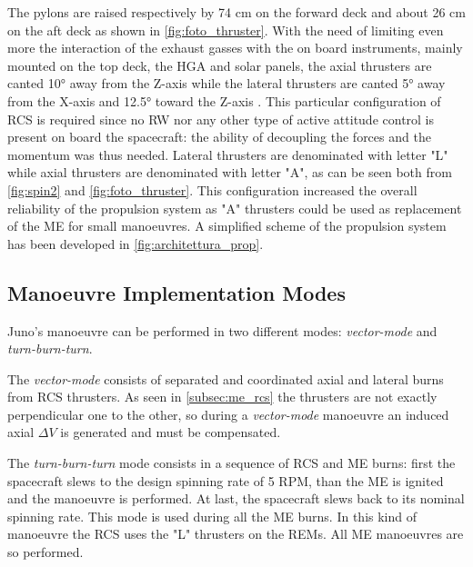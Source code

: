 

The pylons are raised respectively by 74 cm on the forward deck and about 26 cm on the aft deck as shown in \autoref{fig:foto_thruster}.
 With the need of limiting even more the interaction of the exhaust gasses with the on board instruments, mainly mounted on the top deck, the HGA and solar panels, the axial thrusters are canted 10° away from the Z-axis while the lateral thrusters are canted 5° away from the X-axis and 12.5° toward the Z-axis \cite{junno_inner}. This particular configuration of RCS is required since no RW nor any other type of active attitude control is present on board the spacecraft: the ability of decoupling the forces and the momentum was thus needed.
Lateral thrusters are denominated with letter "L" while axial thrusters are denominated with letter "A", as can be seen both from \autoref{fig:spin2} and \autoref{fig:foto_thruster}. This configuration increased the overall reliability of the propulsion system as "A" thrusters could be used as replacement of the ME for small manoeuvres. A simplified scheme of the propulsion system has been developed in \autoref{fig:architettura_prop}.

\subsection{Manoeuvre Implementation Modes}
\label{subsec:manoeuvre_implemementation_modes}

Juno's manoeuvre can be performed in two different modes: \textit{vector-mode} and \textit{turn-burn-turn}.

The \textit{vector-mode} consists of separated and coordinated axial and lateral burns from RCS thrusters. As seen in \autoref{subsec:me_rcs} the thrusters are not exactly perpendicular one to the other, so during a \textit{vector-mode} manoeuvre an induced axial $\Delta V$ is generated and must be compensated.

The \textit{turn-burn-turn} mode consists in a sequence of RCS and ME burns: first the spacecraft slews to the design spinning rate of 5 RPM, than the ME is ignited and the manoeuvre is performed. At last, the spacecraft slews back to its nominal spinning rate. This mode is used during all the ME burns. In this kind of manoeuvre the RCS uses the "L" thrusters on the REMs. All ME manoeuvres are so performed.

